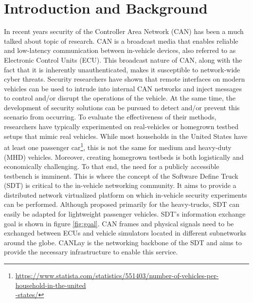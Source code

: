\documentclass[letterpaper,twocolumn,12pt]{article}
\begin{document}
\section{Introduction and Background}
In recent years security of the Controller Area Network (CAN) has been a much talked about topic of research. CAN is a broadcast media that enables reliable and low-latency communication between in-vehicle devices, also referred to as Electronic Control Units (ECU). This broadcast nature of CAN, along with the fact that it is inherently unauthenticated, makes it susceptible to network-wide cyber threats. 
Security researchers have shown \cite{checkoway_comprehensive_2011, mukherjee_practical_2016,burakova_truck_2016} that remote interfaces on modern vehicles can be used to intrude into internal CAN networks and inject messages to control and/or disrupt the operations of the vehicle. At the same time, the development of security solutions can be pursued to detect and/or prevent this scenario from occurring.
To evaluate the effectiveness of their methods, researchers have typically experimented on real-vehicles or homegrown testbed setups that mimic real vehicles. 
While most households in the United States have at least one passenger car\footnote{\url{https://www.statista.com/statistics/551403/number-of-vehicles-per-household-in-the-united}\\\url{-states/}}, this is not the same for medium and heavy-duty (MHD) vehicles. 
Moreover, creating homegrown testbeds is both logistically and economically challenging. To that end, the need for a publicly accessible testbench is imminent. This is where the concept of the Software Define Truck (SDT) \cite{mukherjee_towards_2021} is critical to the in-vehicle networking community. It aims to provide a distributed network virtualized platform on which in-vehicle security experiments can be performed. Although proposed primarily for the heavy-trucks, SDT can easily be adapted for lightweight passenger vehicles. SDT's information exchange goal is shown in figure \ref{fig:goal}. CAN frames and physical signals need to be exchanged between ECUs and vehicle simulators located in different subnetworks around the globe. CANLay is the networking backbone of the SDT and aims to provide the necessary infrastructure to enable this service.
\end{document}
